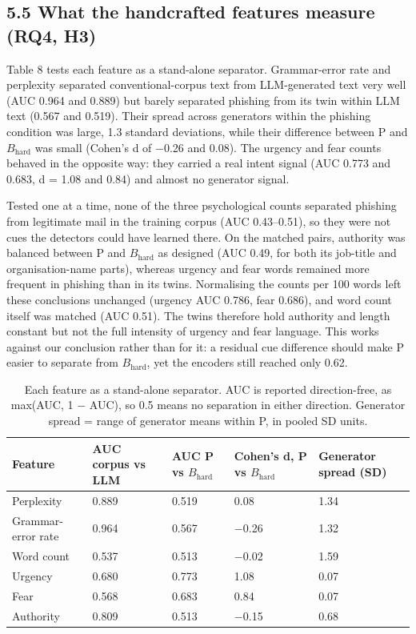 \documentclass[11pt,letterpaper]{article}
\begin{document}
\subsection{5.5 What the handcrafted features measure (RQ4, H3)}

Table 8 tests each feature as a stand-alone separator. Grammar-error rate and perplexity separated conventional-corpus text from LLM-generated text very well (AUC 0.964 and 0.889) but barely separated phishing from its twin within LLM text (0.567 and 0.519). Their spread across generators within the phishing condition was large, 1.3 standard deviations, while their difference between P and $B_{\mathrm{hard}}$ was small (Cohen's d of $-$0.26 and 0.08). The urgency and fear counts behaved in the opposite way: they carried a real intent signal (AUC 0.773 and 0.683, d = 1.08 and 0.84) and almost no generator signal.

Tested one at a time, none of the three psychological counts separated phishing from legitimate mail in the training corpus (AUC 0.43--0.51), so they were not cues the detectors could have learned there. On the matched pairs, authority was balanced between P and $B_{\mathrm{hard}}$ as designed (AUC 0.49, for both its job-title and organisation-name parts), whereas urgency and fear words remained more frequent in phishing than in its twins. Normalising the counts per 100 words left these conclusions unchanged (urgency AUC 0.786, fear 0.686), and word count itself was matched (AUC 0.51). The twins therefore hold authority and length constant but not the full intensity of urgency and fear language. This works against our conclusion rather than for it: a residual cue difference should make P easier to separate from $B_{\mathrm{hard}}$, yet the encoders still reached only 0.62.

\begin{table}[!htbp]
\centering
\footnotesize
\caption{Each feature as a stand-alone separator. AUC is reported direction-free, as max(AUC, 1 $-$ AUC), so 0.5 means no separation in either direction. Generator spread = range of generator means within P, in pooled SD units.}
\begin{tabularx}{\linewidth}{YYlYY}
\toprule
\textbf{Feature} & \textbf{AUC corpus vs LLM} & \textbf{AUC P vs $B_{\mathrm{hard}}$} & \textbf{Cohen's d, P vs $B_{\mathrm{hard}}$} & \textbf{Generator spread (SD)} \\
\midrule
Perplexity & 0.889 & 0.519 & 0.08 & 1.34 \\
Grammar-error rate & 0.964 & 0.567 & $-$0.26 & 1.32 \\
Word count & 0.537 & 0.513 & $-$0.02 & 1.59 \\
Urgency & 0.680 & 0.773 & 1.08 & 0.07 \\
Fear & 0.568 & 0.683 & 0.84 & 0.07 \\
Authority & 0.809 & 0.513 & $-$0.15 & 0.68 \\
\bottomrule
\end{tabularx}
\end{table}
\end{document}
